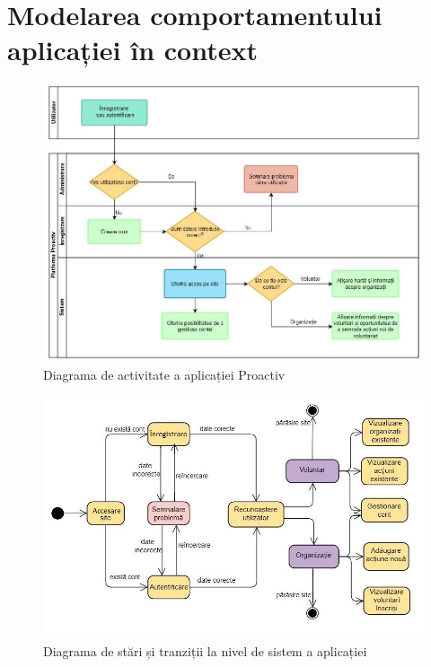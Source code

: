 \documentclass[12pt,a4paper]{report}
\begin{document}
\section{Modelarea comportamentului aplicației în context}
\begin{figure}[h!]
\centering
  \includegraphics[width=0.7\linewidth]{./imagini/swimlane.JPG}
  \caption{Diagrama de activitate a aplicației Proactiv}
\end{figure}

\begin{figure}[h!]
\centering
  \includegraphics[width=0.9\linewidth]{./imagini/stateMachine.JPG}
  \caption{Diagrama de stări și tranziții la nivel de sistem a aplicației}
\end{figure}
\end{document}
